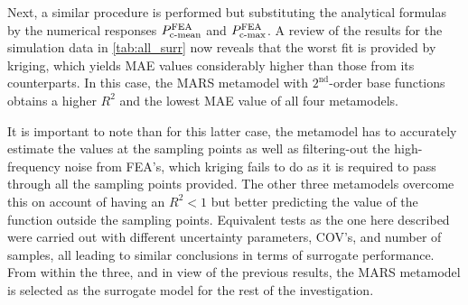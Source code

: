 \documentclass[12pt,number,preprint,review,times]{elsarticle}
\begin{document}
Next, a similar procedure is performed but substituting the analytical formulas by the numerical responses $P^{\mathrm{FEA}}_{\mathrm{c{\text -}mean}}$ and $P^{\mathrm{FEA}}_{\mathrm{c{\text -}max}}$. A review of the results for the simulation data in \cref{tab:all_surr} now reveals that the worst fit is provided by kriging, which yields MAE values considerably higher than those from its counterparts. In this case, the MARS metamodel with $2^{\mathrm{nd}}$-order base functions obtains a higher $R^2$ and the lowest MAE value of all four metamodels. 

It is important to note than for this latter case, the metamodel has to accurately estimate the values at the sampling points as well as filtering-out the high-frequency noise from FEA's, which kriging fails to do as it is required to pass through all the sampling points provided. The other three metamodels overcome this on account of having an $R^2 < 1$ but better predicting the value of the function outside the sampling points. Equivalent tests as the one here described were carried out with different uncertainty parameters, COV's, and number of samples, all leading to similar conclusions in terms of surrogate performance. From within the three, and in view of the previous results, the MARS metamodel is selected as the surrogate model for the rest of the investigation. 
\end{document}
